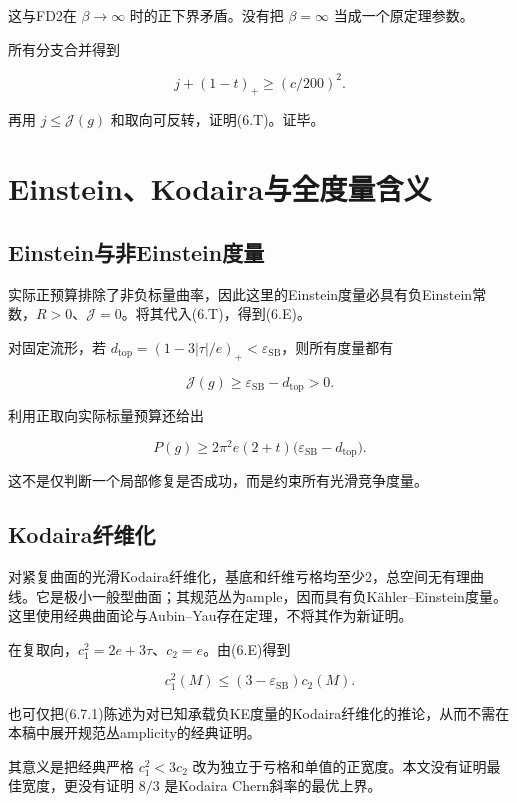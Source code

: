 \documentclass[UTF8,11pt,openany,fontset=none]{ctexbook}
\theoremstyle{definition}
\theoremstyle{remark}
\begin{document}
这与FD2在 \(\beta\to\infty\) 时的正下界矛盾。没有把 \(\beta=\infty\) 当成一个原定理参数。

所有分支合并得到

\[
j+(1-t)_+\ge(c/200)^2.
\]

再用 \(j\le\mathcal J(g)\) 和取向可反转，证明(6.T)。证毕。

\section{Einstein、Kodaira与全度量含义}\label{v6-einsteinkodairaux4e0eux5168ux5ea6ux91cfux542bux4e49}

\subsection{Einstein与非Einstein度量}\label{v6-einsteinux4e0eux975eeinsteinux5ea6ux91cf}

实际正预算排除了非负标量曲率，因此这里的Einstein度量必具有负Einstein常数，\(R>0\)、\(\mathcal J=0\)。将其代入(6.T)，得到(6.E)。

对固定流形，若 \(d_{\mathrm{top}}=(1-3|\tau|/e)_+<\varepsilon_{\mathrm{SB}}\)，则所有度量都有

\[
\mathcal J(g)\ge\varepsilon_{\mathrm{SB}}-d_{\mathrm{top}}>0.
\]

利用正取向实际标量预算还给出

\[
P(g)\ge2\pi^2 e(2+t)
\bigl(\varepsilon_{\mathrm{SB}}-d_{\mathrm{top}}\bigr).
\]

这不是仅判断一个局部修复是否成功，而是约束所有光滑竞争度量。

\subsection{Kodaira纤维化}\label{v6-kodairaux7ea4ux7ef4ux5316}

对紧复曲面的光滑Kodaira纤维化，基底和纤维亏格均至少2，总空间无有理曲线。它是极小一般型曲面；其规范丛为ample，因而具有负Kähler--Einstein度量。这里使用经典曲面论与Aubin--Yau存在定理，不将其作为新证明。

在复取向，\(c_1^2=2e+3\tau\)、\(c_2=e\)。由(6.E)得到

\[
\boxed{c_1^2(M)\le(3-\varepsilon_{\mathrm{SB}})c_2(M).}
\tag{6.7.1}
\]

也可仅把(6.7.1)陈述为对已知承载负KE度量的Kodaira纤维化的推论，从而不需在本稿中展开规范丛amplicity的经典证明。

其意义是把经典严格 \(c_1^2<3c_2\) 改为独立于亏格和单值的正宽度。本文没有证明最佳宽度，更没有证明 \(8/3\) 是Kodaira Chern斜率的最优上界。
\end{document}
